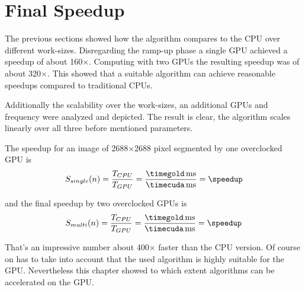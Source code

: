 

\section{Final Speedup} %
\label{sec:final_speedup}
The previous sections showed how the algorithm compares to the \gls{CPU} over
different work-sizes. Disregarding the ramp-up phase a single \gls{GPU} achieved
a speedup of about 160$\times$. Computing with two \glspl{GPU} the resulting 
speedup was of about 320$\times$. This showed that a suitable algorithm can 
achieve reasonable speedups compared to traditional \glspl{CPU}.

Additionally the scalability over the work-sizes, an additional \glspl{GPU} and
frequency were analyzed and depicted. The result is clear, the algorithm scales
linearly over all three before mentioned parameters. 

\fpDiv{\speedup}{\timegold}{\timecuda}

The speedup for an image of 2688$\times$2688 pixel segmented by one
overclocked \gls{GPU} is 
\begin{equation}\label{eq:final_speedup_single}
 S_{single}(n) = \frac{T_{CPU}}{T_{GPU}} = \frac{\unit[\timegold]{ms}}{\unit[\timecuda]{ms}} = \speedup
\end{equation}

\fpDiv{\speedup}{\timegold}{\timecuda}

and the final speedup by two overclocked \glspl{GPU} is
\begin{equation}\label{eq:final_speedup_multi}
 S_{multi}(n) = \frac{T_{CPU}}{T_{GPU}} = \frac{\unit[\timegold]{ms}}{\unit[\timecuda]{ms}} = \speedup
\end{equation}

That's an impressive number about 400$\times$ faster than the \gls{CPU} version. 
Of course on has to take into account that the used algorithm is highly suitable
for the \gls{GPU}. Nevertheless this chapter showed to which extent algorithms 
can be accelerated on the \gls{GPU}.



